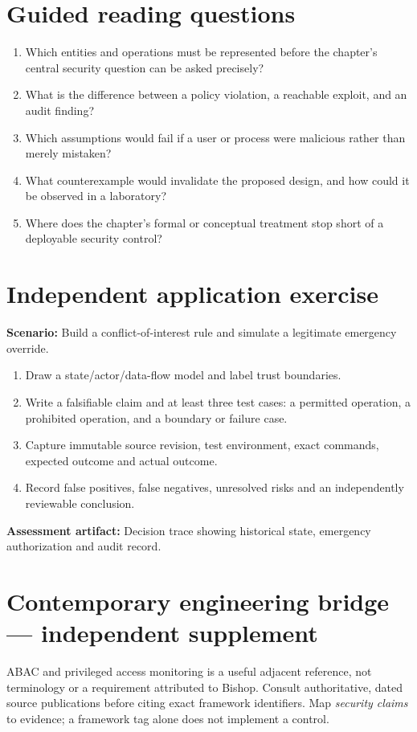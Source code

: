 \documentclass[10pt,letterpaper]{article}
\begin{document}
\section{Guided reading questions}
\begin{enumerate}
\item Which entities and operations must be represented before the chapter's central security question can be asked precisely?
\item What is the difference between a policy violation, a reachable exploit, and an audit finding?
\item Which assumptions would fail if a user or process were malicious rather than merely mistaken?
\item What counterexample would invalidate the proposed design, and how could it be observed in a laboratory?
\item Where does the chapter's formal or conceptual treatment stop short of a deployable security control?
\end{enumerate}
\section{Independent application exercise}
\textbf{Scenario:} Build a conflict-of-interest rule and simulate a legitimate emergency override.
\begin{enumerate}
\item Draw a state/actor/data-flow model and label trust boundaries.
\item Write a falsifiable claim and at least three test cases: a permitted operation, a prohibited operation, and a boundary or failure case.
\item Capture immutable source revision, test environment, exact commands, expected outcome and actual outcome.
\item Record false positives, false negatives, unresolved risks and an independently reviewable conclusion.
\end{enumerate}
\textbf{Assessment artifact:} Decision trace showing historical state, emergency authorization and audit record.
\section{Contemporary engineering bridge --- independent supplement}
ABAC and privileged access monitoring is a useful adjacent reference, not terminology or a requirement attributed to Bishop. Consult authoritative, dated source publications before citing exact framework identifiers. Map \emph{security claims} to evidence; a framework tag alone does not implement a control.
\end{document}
